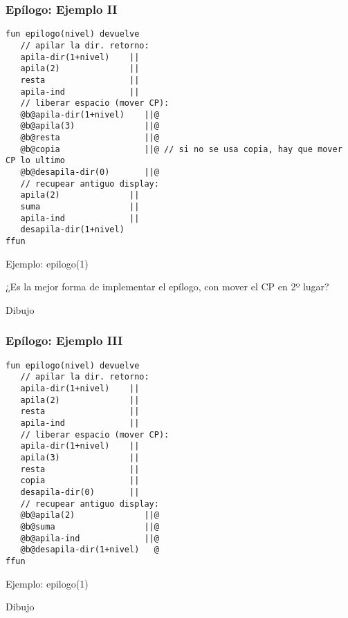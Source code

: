 \documentclass[hyperref={pdfpagelabels=false},tree-dvips]{beamer}
\begin{document}
\begin{frame}[fragile]
\frametitle{Epílogo: Ejemplo II}

\begin{lstlisting}[style=codigoMP,basicstyle=\tiny\ttfamily]
fun epilogo(nivel) devuelve
   // apilar la dir. retorno:
   apila-dir(1+nivel)    ||
   apila(2)              ||
   resta                 ||
   apila-ind             ||
   // liberar espacio (mover CP):
   @b@apila-dir(1+nivel)    ||@
   @b@apila(3)              ||@
   @b@resta                 ||@
   @b@copia                 ||@ // si no se usa copia, hay que mover CP lo ultimo
   @b@desapila-dir(0)       ||@
   // recupear antiguo display:
   apila(2)              ||
   suma                  ||
   apila-ind             ||
   desapila-dir(1+nivel)
ffun
\end{lstlisting}

Ejemplo: epilogo(1)

¿Es la mejor forma de implementar el epílogo, con mover el CP en 2º lugar?

Dibujo

\end{frame}
\begin{frame}[fragile]
\frametitle{Epílogo: Ejemplo III}

\begin{lstlisting}[style=codigoMP,basicstyle=\tiny\ttfamily]
fun epilogo(nivel) devuelve
   // apilar la dir. retorno:
   apila-dir(1+nivel)    ||
   apila(2)              ||
   resta                 ||
   apila-ind             ||
   // liberar espacio (mover CP):
   apila-dir(1+nivel)    ||
   apila(3)              ||
   resta                 ||
   copia                 ||
   desapila-dir(0)       ||
   // recupear antiguo display:
   @b@apila(2)              ||@
   @b@suma                  ||@
   @b@apila-ind             ||@
   @b@desapila-dir(1+nivel)   @
ffun
\end{lstlisting}

Ejemplo: epilogo(1)

Dibujo

\end{frame}
\end{document}
